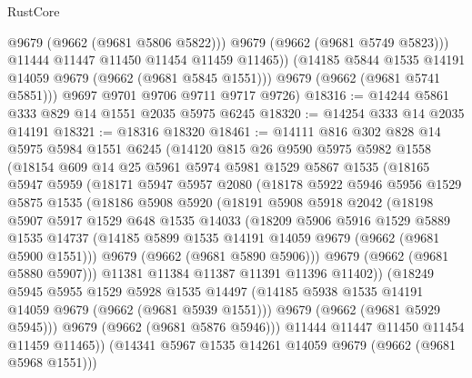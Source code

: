\begin{lexlean}{RustCore}
\begin{coremodule}
                @9679
                (@9662 (@9681 @5806 @5822)))
              @9679
              (@9662 (@9681 @5749 @5823)))
            @11444
            @11447
            @11450
            @11454
            @11459
            @11465))
        (@14185 @5844 @1535 @14191 @14059 @9679 (@9662 (@9681 @5845 @1551)))
        @9679
        (@9662 (@9681 @5741 @5851)))
      @9697
      @9701
      @9706
      @9711
      @9717
      @9726)
@18316 := @14244 @5861 @333 @829 @14 @1551 @2035 @5975 @6245
@18320 := @14254 @333 @14 @2035 @14191
@18321 := @18316 @18320
@18461 := @14111
    @816
    @302
    @828
    @14
    @5975
    @5984
    @1551
    @6245
    (@14120
      @815
      @26
      @9590
      @5975
      @5982
      @1558
      (@18154
        @609
        @14
        @25
        @5961
        @5974
        @5981
        @1529
        @5867
        @1535
        (@18165
          @5947
          @5959
          (@18171
            @5947
            @5957
            @2080
            (@18178
              @5922
              @5946
              @5956
              @1529
              @5875
              @1535
              (@18186
                @5908
                @5920
                (@18191
                  @5908
                  @5918
                  @2042
                  (@18198
                    @5907
                    @5917
                    @1529
                    @648
                    @1535
                    @14033
                    (@18209
                      @5906
                      @5916
                      @1529
                      @5889
                      @1535
                      @14737
                      (@14185 @5899 @1535 @14191 @14059 @9679 (@9662 (@9681 @5900 @1551)))
                      @9679
                      (@9662 (@9681 @5890 @5906)))
                    @9679
                    (@9662 (@9681 @5880 @5907)))
                  @11381
                  @11384
                  @11387
                  @11391
                  @11396
                  @11402))
              (@18249
                @5945
                @5955
                @1529
                @5928
                @1535
                @14497
                (@14185 @5938 @1535 @14191 @14059 @9679 (@9662 (@9681 @5939 @1551)))
                @9679
                (@9662 (@9681 @5929 @5945)))
              @9679
              (@9662 (@9681 @5876 @5946)))
            @11444
            @11447
            @11450
            @11454
            @11459
            @11465))
        (@14341 @5967 @1535 @14261 @14059 @9679 (@9662 (@9681 @5968 @1551)))

\end{coremodule}
\end{lexlean}
